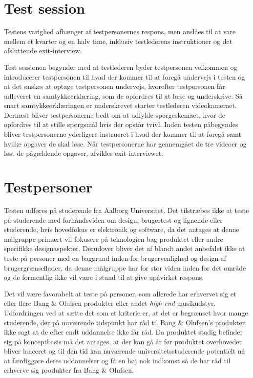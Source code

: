 \section{Test session}
\label{TestSessionValgAfGestikker}
%
Testens varighed afhænger af testpersonernes respons, men anslåes til at vare mellem et kvarter og en halv time, inklusiv testlederens instruktioner og det afsluttende exit-interview.

Test sessionen begynder med at testlederen byder testpersonen velkommen og introducerer testpersonen til hvad der kommer til at foregå undervejs i testen og at det ønskes at optage testpersonen undervejs, hvorefter testpersonen får udleveret en samtykkeerklæring, som de opfordres til at læse og underskrive. Så snart samtykkeerklæringen er underskrevet starter testlederen videokameraet. Dernæst bliver testpersonerne bedt om at udfylde spørgeskemaet, hvor de opfordres til at stille spørgsmål hvis der opstår tvivl. Inden testen påbegyndes bliver testpersonerne yderligere instrueret i hvad der kommer til at foregå samt hvilke opgaver de skal løse. Når testpersonerne har gennemgået de tre videoer og løst de pågældende opgaver, afvikles exit-interviewet. 
%

\section{Testpersoner}
\label{TestpersonerValgAfGestikker}
%
Testen udføres på studerende fra Aalborg Universitet. Det tilstræbes ikke at teste på studerende med forhåndsviden om design, brugertest og lignende eller studerende, hvis hovedfokus er elektronik og software, da det antages at denne målgruppe primært vil fokusere på teknologien bag produktet eller andre specifikke designaspekter. Derudover bliver det af \textcite[s. 110]{Book:OUE} blandt andet anbefalet ikke at teste på personer med en baggrund inden for brugervenlighed og design af brugergrænseflader, da denne målgruppe har for stor viden inden for det område og de formentlig ikke vil være i stand til at give upåvirket respons.

Det vil være favorabelt at teste på personer, som allerede har erhvervet sig et eller flere Bang $\&$ Olufsen produkter eller andet \textit{high-end} musikudstyr. Udfordringen ved at sætte det som et kriterie er, at det er begrænset hvor mange studerende, der på nuværende tidspunkt har råd til Bang $\&$ Olufsen's produkter, ikke sagt at de efter endt uddannelse ikke får råd. Da produktet stadig befinder sig på konceptbasis må det antages, at der kan gå år før produktet overhovedet bliver lanceret og til den tid kan nuværende universitetsstuderende potentielt nå at færdiggøre deres uddannelser og få en høj nok indkomst så de har råd til erhverve sig produkter fra Bang $\&$ Olufsen.
%

